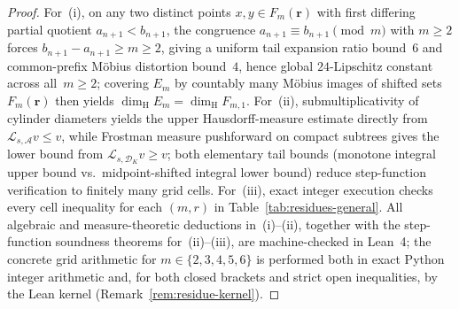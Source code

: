 \documentclass[11pt]{article}
\theoremstyle{definition}
\theoremstyle{remark}
\newcommand{\dimH}{\dim_{\mathrm{H}}}
\begin{document}
\begin{proof}
For~(i), on any two distinct points $x,y\in F_m(\mathbf r)$ with first differing
partial quotient $a_{n+1}<b_{n+1}$, the congruence $a_{n+1}\equiv b_{n+1}\pmod m$
with $m\ge2$ forces $b_{n+1}-a_{n+1}\ge m\ge2$, giving a uniform tail expansion
ratio bound~$6$ and common-prefix Möbius distortion bound~$4$, hence global
$24$-Lipschitz constant across all~$m\ge2$; covering $E_m$ by countably many
Möbius images of shifted sets $F_m(\mathbf r)$ then yields $\dimH E_m=\dimH F_{m,1}$.
For~(ii), submultiplicativity of cylinder diameters yields the upper
Hausdorff-measure estimate directly from $\mathcal L_{s,\mathcal A}v\le v$, while
Frostman measure pushforward on compact subtrees gives the lower bound from
$\mathcal L_{s,\mathcal D_K}v\ge v$; both elementary tail bounds (monotone
integral upper bound vs.\ midpoint-shifted integral lower bound) reduce step-function
verification to finitely many grid cells. For~(iii), exact integer execution
checks every cell inequality for each $(m,r)$ in Table~\ref{tab:residues-general}.
All algebraic and measure-theoretic deductions in~(i)--(ii), together with the
step-function soundness theorems for~(ii)--(iii), are machine-checked in Lean~4;
the concrete grid arithmetic for $m\in\{2,3,4,5,6\}$ is performed both in exact
Python integer arithmetic and, for both closed brackets and strict open inequalities, by the Lean kernel
(Remark~\ref{rem:residue-kernel}).
\end{proof}
\end{document}
